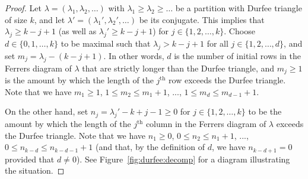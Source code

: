 \documentclass[11pt]{article}
\theoremstyle{plain}
\theoremstyle{definition}
\newcommand{\textdots}{...}
\begin{document}
\begin{proof}
  Let $\lambda = (\lambda_1, \lambda_2, \ldots)$ with $\lambda_1 \geq
  \lambda_2 \geq \ldots$ be a partition with Durfee triangle of size $k$,
  and let $\lambda' = (\lambda_1', \lambda_2', \ldots)$ be its conjugate. This
  implies that $\lambda_j \geq k - j + 1$ (as well as $\lambda_j'
  \geq k - j + 1$) for $j \in \{ 1, 2, \ldots, k \}$. Choose $d \in \{ 0,
  1, \ldots, k \}$ to be maximal such that $\lambda_j > k - j + 1$ for all $j
  \in \{ 1, 2, \ldots, d \}$, and set $m_j = \lambda_j - (k - j + 1)$. In
  other words, $d$ is the number of initial rows in the Ferrers diagram of
  $\lambda$ that are strictly longer than the Durfee triangle, and $m_j
  \geq 1$ is the amount by which the length of the $j^{\text{th}}$ row
  exceeds the Durfee triangle. Note that we have $m_1 \geq 1$, $1
  \leq m_2 \leq m_1 + 1$, {\textdots}, $1 \leq m_d \leq
  m_{d - 1} + 1$.
  
  On the other hand, set $n_j = \lambda_j' - k + j - 1 \geq 0$ for $j \in
  \{ 1, 2, \ldots, k \}$ to be the amount by which the length of the
  $j^{\text{th}}$ column in the Ferrers diagram of $\lambda$ exceeds the
  Durfee triangle. Note that we have $n_1 \geq 0$, $0 \leq n_2
  \leq n_1 + 1$, {\textdots}, $0 \leq n_{k - d} \leq n_{k - d -
  1} + 1$ (and that, by the definition of $d$, we have $n_{k - d + 1} = 0$
  provided that $d \neq 0$). See Figure~\ref{fig:durfee:decomp} for a diagram
  illustrating the situation.
  

\end{proof}
\end{document}
